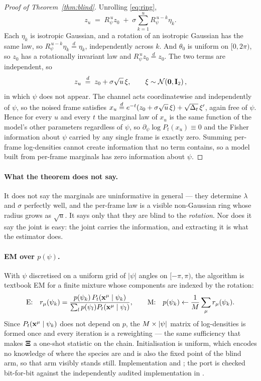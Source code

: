 \begin{proof}[Proof of Theorem~\ref{thm:blind}]
Unrolling \eqref{eq:ring},
\[
z_u \;=\; R_\psi^{\,u} z_0 \;+\; \sigma\sum_{k=1}^{u} R_\psi^{\,u-k}\eta_k .
\]
Each $\eta_k$ is isotropic Gaussian, and a rotation of an isotropic Gaussian has the same law, so
$R_\psi^{\,u-k}\eta_k \overset{d}{=} \eta_k$, independently across $k$. And $\theta_0$ is uniform
on $[0,2\pi)$, so $z_0$ has a rotationally invariant law and $R_\psi^{\,u}z_0\overset{d}{=}z_0$.
The two terms are independent, so
\[
z_u \;\overset{d}{=}\; z_0 + \sigma\sqrt{u}\,\xi , \qquad \xi\sim\mathcal{N}\!\left(\mathbf{0},\mathbf{I}_2\right),
\]
in which $\psi$ does not appear. The channel acts coordinatewise and independently of $\psi$, so
the noised frame satisfies $x_u\overset{d}{=}e^{-t}(z_0+\sigma\sqrt u\,\xi)+\sqrt{\Delta_t}\,\xi'$,
again free of $\psi$. Hence for every $u$ and every $t$ the marginal law of $x_u$ is the same
function of the model's other parameters regardless of $\psi$, so
$\partial_\psi \log P_t(x_u)\equiv 0$ and the Fisher information about $\psi$ carried by any
single frame is exactly zero. Summing per-frame log-densities cannot create information that no
term contains, so a model built from per-frame marginals has zero information about $\psi$.
\end{proof}

\paragraph{What the theorem does not say.} It does not say the marginals are uninformative in
general --- they determine $\lambda$ and $\sigma$ perfectly well, and the per-frame law is a
visible non-Gaussian ring whose radius grows as $\sqrt{u}$. It says only that they are blind to
the \emph{rotation}. Nor does it say the joint is easy: the joint carries the information, and
extracting it is what the estimator does.

\paragraph{EM over $p(\psi)$.} With $\psi$ discretised on a uniform grid of $|\psi|$ angles on
$[-\pi,\pi)$, the algorithm is textbook EM for a finite mixture whose components are indexed by
the rotation:
\[
\text{E:}\quad r_\mu(\psi_k) = \frac{p(\psi_k)\,P_t(\mathbf{x}^\mu\mid\psi_k)}{\sum_l p(\psi_l)P_t(\mathbf{x}^\mu\mid\psi_l)} ,
\qquad
\text{M:}\quad p(\psi_k) \leftarrow \frac{1}{M}\sum_{\mu} r_\mu(\psi_k) .
\]
Since $P_t(\mathbf{x}^\mu\mid\psi_k)$ does not depend on $p$, the $M\times|\psi|$ matrix of
log-densities is formed once and every iteration is a reweighting --- the same sufficiency that
makes $\mathbf{\Xi}$ a one-shot statistic on the chain. Initialisation is uniform, which encodes no
knowledge of where the species are and is also the fixed point of the blind arm, so that arm
visibly stands still. Implementation  and
; the port is checked bit-for-bit against the
independently audited implementation in .

